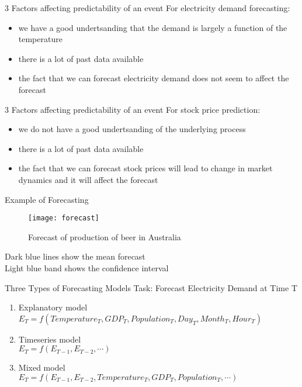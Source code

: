 \documentclass{beamer}
\begin{document}
\begin{frame}{3 Factors affecting predictability of an event}
For electricity demand forecasting:
\begin{itemize}
	\item we have a good undertsanding that the demand is largely a function of the temperature
	\item there is a lot of past data available
	\item the fact that we can forecast electricity demand does not seem to affect the forecast
\end{itemize}
\end{frame}


\begin{frame}{3 Factors affecting predictability of an event}
For stock price prediction:
\begin{itemize}
	\item we do not have a good undertsanding of the underlying process
	\item there is a lot of past data available
	\item the fact that we can forecast stock prices will lead to change in market dynamics and it will affect the forecast
\end{itemize}
\end{frame}


\begin{frame}{Example of Forecasting}
\begin{figure}
	\centering
	\texttt{[image: forecast]}
	\caption{Forecast of production of beer in Australia}
	\label{fig:forecast}
\end{figure}
Dark blue lines show the mean forecast \\
Light blue band shows the confidence interval

\end{frame}

\begin{frame}{Three Types of Forecasting Models}
Task: Forecast Electricity Demand at Time T

\begin{enumerate}
	\item Explanatory model \\$E_T = f(Temperature_T, GDP_T, Population_T, Day_T, Month_T, Hour_T)$
	\item Timeseries model \\ $E_T = f(E_{T-1}, E_{T-2}, \cdots)$
	\item Mixed model \\ $E_T = f(E_{T-1}, E_{T-2},Temperature_T, GDP_T, Population_T, \cdots )$
\end{enumerate}
\end{frame}
\end{document}
